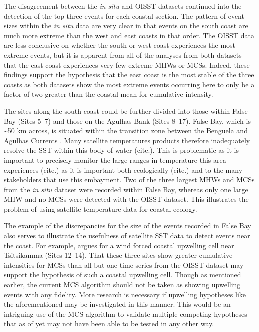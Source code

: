 \documentclass[a4paper,10pt,review]{elsarticle}
\begin{document}
The disagreement between the \emph{in situ} and OISST datasets continued into the detection of the top three events for each coastal section. The pattern of event sizes within the \emph{in situ} data are very clear in that events on the south coast are much more extreme than the west and east coasts in that order. The OISST data are less conclusive on whether the south or west coast experiences the most extreme events, but it is apparent from all of the analyses from both datasets that the east coast experiences very few extreme MHWs or MCSs. Indeed, these findings support the hypothesis that the east coast is the most stable of the three coasts as both datasets show the most extreme events occurring here to only be a factor of two greater than the coastal mean for cumulative intensity.

The sites along the south coast could be further divided into those within False Bay (Sites 5--7) and those on the Agulhas Bank (Sites 8--17). False Bay, which is \textasciitilde 50 km across, is situated within the transition zone between the Benguela and Agulhas Currents \citep{Smit2013}. Many satellite temperatures products therefore inadequately resolve the SST within this body of water  (cite.). This is problematic as it is important to precisely monitor the large ranges in temperature this area experiences (cite.) as it is important both ecologically (cite.) and to the many stakeholders that use this embayment. Two of the three largest MHWs and MCSs from the \emph{in situ} dataset were recorded within False Bay, whereas only one large MHW and no MCSs were detected with the OISST dataset. This illustrates the problem of using satellite temperature data for coastal ecology.

The example of the discrepancies for the size of the events recorded in False Bay also serves to illustrate the usefulness of satellite SST data to detect events near the coast. For example, \citet{Roberts2005} argues for a wind forced coastal upwelling cell near Tsitsikamma (Sites 12--14). That these three sites show greater cumulative intensities for MCSs than all but one time series from the OISST dataset may support the hypothesis of such a coastal upwelling cell. Though as mentioned earlier, the current MCS algorithm should not be taken as showing upwelling events with any fidelity. More research is necessary if upwelling hypotheses like the aforementioned may be investigated in this manner. This would be an intriguing use of the MCS algorithm to validate multiple competing hypotheses that as of yet may not have been able to be tested in any other way.
\end{document}
